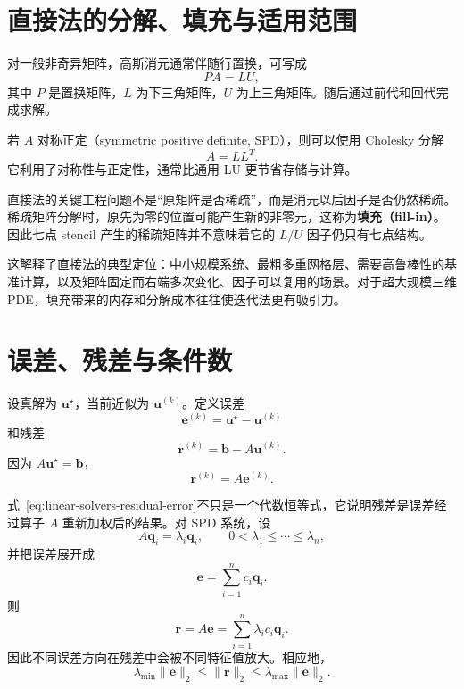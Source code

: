 \section{直接法的分解、填充与适用范围}

对一般非奇异矩阵，高斯消元通常伴随行置换，可写成
\begin{equation}
PA=LU,
\end{equation}
其中 $P$ 是置换矩阵，$L$ 为下三角矩阵，$U$ 为上三角矩阵。随后通过前代和回代完成求解。

若 $A$ 对称正定（symmetric positive definite, SPD），则可以使用 Cholesky 分解
\begin{equation}
A=LL^T.
\end{equation}
它利用了对称性与正定性，通常比通用 LU 更节省存储与计算。

直接法的关键工程问题不是“原矩阵是否稀疏”，而是消元以后因子是否仍然稀疏。稀疏矩阵分解时，原先为零的位置可能产生新的非零元，这称为\textbf{填充（fill-in）}。因此七点 stencil 产生的稀疏矩阵并不意味着它的 $L/U$ 因子仍只有七点结构。

这解释了直接法的典型定位：中小规模系统、最粗多重网格层、需要高鲁棒性的基准计算，以及矩阵固定而右端多次变化、因子可以复用的场景。对于超大规模三维 PDE，填充带来的内存和分解成本往往使迭代法更有吸引力。

\section{误差、残差与条件数}

设真解为 $\bm u^\star$，当前近似为 $\bm u^{(k)}$。定义误差
\begin{equation}
\bm e^{(k)}
=
\bm u^\star-\bm u^{(k)}
\label{eq:linear-solvers-error}
\end{equation}
和残差
\begin{equation}
\bm r^{(k)}
=
\bm b-A\bm u^{(k)}.
\label{eq:linear-solvers-residual}
\end{equation}
因为 $A\bm u^\star=\bm b$，
\begin{equation}
\boxed{
\bm r^{(k)}=A\bm e^{(k)}.
}
\label{eq:linear-solvers-residual-error}
\end{equation}

式~\eqref{eq:linear-solvers-residual-error}不只是一个代数恒等式，它说明残差是误差经过算子 $A$ 重新加权后的结果。对 SPD 系统，设
\begin{equation}
A\bm q_i=\lambda_i\bm q_i,
\qquad
0<\lambda_1\le\cdots\le\lambda_n,
\end{equation}
并把误差展开成
\begin{equation}
\bm e
=
\sum_{i=1}^{n}c_i\bm q_i.
\end{equation}
则
\begin{equation}
\boxed{
\bm r
=
A\bm e
=
\sum_{i=1}^{n}\lambda_i c_i\bm q_i.
}
\label{eq:linear-solvers-residual-eigenbasis}
\end{equation}
因此不同误差方向在残差中会被不同特征值放大。相应地，
\begin{equation}
\boxed{
\lambda_{\min}\|\bm e\|_2
\le
\|\bm r\|_2
\le
\lambda_{\max}\|\bm e\|_2.
}
\label{eq:linear-solvers-residual-error-spd-bounds}
\end{equation}


